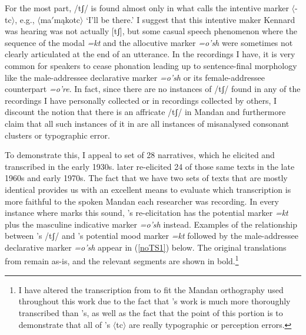 For the most part, /tʃ/ is found almost only in what \citet[19]{kennard1936} calls the intentive marker $\langle$-tc$\rangle$, e.g., $\langle$ma$'$mąkotc$\rangle$ `I'll be there.' I suggest that this intentive maker Kennard was hearing was not actually [tʃ], but some casual speech phenomenon where the sequence of the modal \textit{=kt} and the allocutive marker \textit{=o'sh} were sometimes not clearly articulated at the end of an utterance. In the recordings I have, it is very common for speakers to cease phonation leading up to sentence-final morphology like the male-addressee declarative marker \textit{=o'sh} or its female-addressee counterpart \textit{=o're}. In fact, since there are no instances of /tʃ/ found in any of the recordings I have personally collected or in recordings collected by others, I discount the notion that there is an affricate /tʃ/ in Mandan and furthermore claim that all such instances of it in \citet{kennard1934,kennard1936} are all instances of misanalysed consonant clusters or typographic error.

To demonstrate this, I appeal to  set of 28 narratives, which he elicited and transcribed in the early 1930s. \citet{hollow1973b} later re-elicited 24 of those same texts in the late 1960s and early 1970s. The fact that we have two sets of texts that are mostly identical provides us with an excellent means to evaluate which transcription is more faithful to the spoken Mandan each researcher was recording. In every instance where \citeauthor{kennard1936} marks this sound, \citeauthor{hollow1970}'s re-elicitation has the potential marker \textit{=kt} plus the masculine indicative marker \textit{=o'sh} instead. Examples of the relationship between \citeauthor{kennard1936}'s /tʃ/ and \citeauthor{hollow1970}'s potential mood marker \textit{=kt} followed by the male-addressee declarative marker \textit{=o'sh} appear in (\ref{noTS1}) below. The original translations from \citeauthor{kennard1934} remain as-is, and the relevant segments are shown in bold.\footnote{I have altered the transcription from \citet{hollow1973b} to fit the Mandan orthography used throughout this work due to the fact that \citeauthor{hollow1970}'s work is much more thoroughly transcribed than \citeauthor{kennard1936}'s, as well as the fact that the point of this portion is to demonstrate that all of \citeauthor{kennard1936}'s $\langle$tc$\rangle$ are really typographic or perception errors.}


